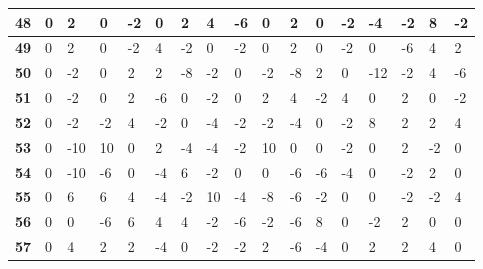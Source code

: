 \begin{longtable}[c]{|l|l|l|l|l|l|l|l|l|l|l|l|l|l|l|l|l|}
\textbf{48} & 0          & 2          & 0          & -2         & 0          & 2          & 4          & -6         & 0          & 2          & 0           & -2          & -4          & -2          & 8           & -2          \\ \hline
\textbf{49} & 0          & 2          & 0          & -2         & 4          & -2         & 0          & -2         & 0          & 2          & 0           & -2          & 0           & -6          & 4           & 2           \\ \hline
\textbf{50} & 0          & -2         & 0          & 2          & 2          & -8         & -2         & 0          & -2         & -8         & 2           & 0           & -12         & -2          & 4           & -6          \\ \hline
\textbf{51} & 0          & -2         & 0          & 2          & -6         & 0          & -2         & 0          & 2          & 4          & -2          & 4           & 0           & 2           & 0           & -2          \\ \hline
\textbf{52} & 0          & -2         & -2         & 4          & -2         & 0          & -4         & -2         & -2         & -4         & 0           & -2          & 8           & 2           & 2           & 4           \\ \hline
\textbf{53} & 0          & -10        & 10         & 0          & 2          & -4         & -4         & -2         & 10         & 0          & 0           & -2          & 0           & 2           & -2          & 0           \\ \hline
\textbf{54} & 0          & -10        & -6         & 0          & -4         & 6          & -2         & 0          & 0          & -6         & -6          & -4          & 0           & -2          & 2           & 0           \\ \hline
\textbf{55} & 0          & 6          & 6          & 4          & -4         & -2         & 10         & -4         & -8         & -6         & -2          & 0           & 0           & -2          & -2          & 4           \\ \hline
\textbf{56} & 0          & 0          & -6         & 6          & 4          & 4          & -2         & -6         & -2         & -6         & 8           & 0           & -2          & 2           & 0           & 0           \\ \hline
\textbf{57} & 0          & 4          & 2          & 2          & -4         & 0          & -2         & -2         & 2          & -6         & -4          & 0           & 2           & 2           & 4           & 0           \\ \hline

\end{longtable}
